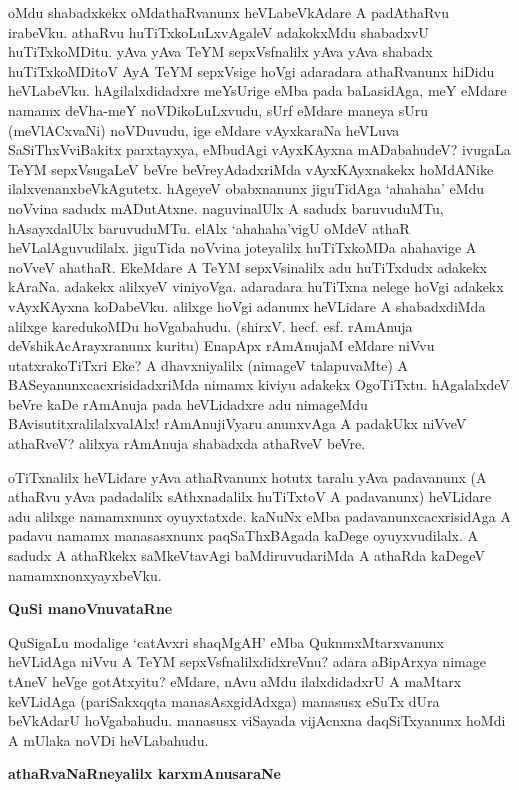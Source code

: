 \noindent
oMdu shabadxkekx oMdathaRvanunx heVLabeVkAdare A padAthaRvu irabeVku. 
athaRvu huTiTxkoLuLx\-vAgaleV adakokxMdu shabadxvU huTiTxkoMDitu. yAva 
yAva TeYM sepxVsfnalilx yAva yAva shabadx huTiTx\-koMDitoV AyA TeYM 
sepxVsige hoVgi adaradara athaRvanunx hiDidu heVLabeVku. 
hAgilalxdidadxre meYsU\-rige eMba pada baLasidAga, meY eMdare namamx 
deVha-meY noVDikoLuLxvudu, sUrf eMdare maneya sUru (meVlACxvaNi) 
noVDuvudu, ige eMdare vAyxkaraNa heVLuva SaSiThxVviBakitx parxtayxya, 
eMbudAgi vAyxKAyxna mADabahudeV? ivugaLa TeYM sepxVsugaLeV beVre beVreyAdadxriMda vAyxKAyxnakekx hoMdANike  ilalxvenanx\-beVkA\-gutetx. hAgeyeV obabxnanunx jiguTidAga `ahahaha' eMdu noVvina sadudx mADutAtxne. naguvi\-nalUlx A sadudx baruvuduMTu, hAsayxdalUlx baruvuduMTu. elAlx `ahahaha'vigU oMdeV athaR heVLa\-lAgu\-vudilalx. jiguTida noVvina joteyalilx huTiTxkoMDa ahahavige A noVveV ahathaR. EkeMdare A TeYM sepxVsinalilx adu huTiTxdudx adakekx kAraNa. adakekx alilxyeV viniyoVga. adaradara huTiTxna nelege hoVgi adakekx vAyxKAyxna koDabeVku. alilxge hoVgi adanunx heVLidare A shabadxdiMda alilxge karedukoMDu hoVga\-bahudu.  (shirxV. hecf. esf. rAmAnuja deVshikAcArayxranunx kuritu) EnapApx rAmAnujaM \-eMdare niVvu utatxrakoTiTxri Eke? A dhavxniyalilx (nimageV talapuvaMte) A BASeyanunxcacxrisidadxriMda nimamx kiviyu adakekx OgoTiTxtu. hAgalalxdeV beVre kaDe rAmAnuja pada heVLidadxre adu nimageMdu BAvisu\-titxra\-lilalx\-valAlx! rAmAnujiVyaru anunxvAga A padakUkx niVveV athaRveV? alilxya rAmAnuja shabadxda athaRveV beVre. 

oTiTxnalilx heVLidare yAva athaRvanunx hotutx taralu yAva padavanunx (A athaRvu yAva padadalilx sAthxnadalilx huTiTxtoV A padavanunx) heVLidare adu alilxge namamxnunx oyuyxtatxde.  kaNuNx eMba padavanunxcacxrisidAga A padavu namamx manasasxnunx paqSaThxBAgada kaDege oyuyxvudilalx. A sadudx A athaRkekx saMkeVtavAgi baMdiruvudariMda A athaRda kaDegeV namamxnonxyayxbeVku.

{\bigskip
\noindent
{\large\bf QuSi manoVnuvataRne}}\label{page114}
\medskip

\noindent
QuSigaLu modalige `catAvxri shaqMgAH' eMba QuknmxMtarxvanunx heVLidAga niVvu A TeYM sepxVsfnalilxdidx\-reVnu? adara aBipArxya nimage tAneV heVge gotAtxyitu? eMdare, nAvu aMdu ilalxdidadxrU A maMtarx keVLidAga (pariSakxqqta manasAsxgidAdxga) manasusx eSuTx dUra beVkAdarU hoVgabahudu. manasusx viSa\-yada vijAcnxna daqSiTxyanunx hoMdi A mUlaka noVDi heVLabahudu.

{\bigskip
\noindent
{\large\bf athaRvaNaRneyalilx karxmAnusaraNe}}\label{page144}
\medskip

